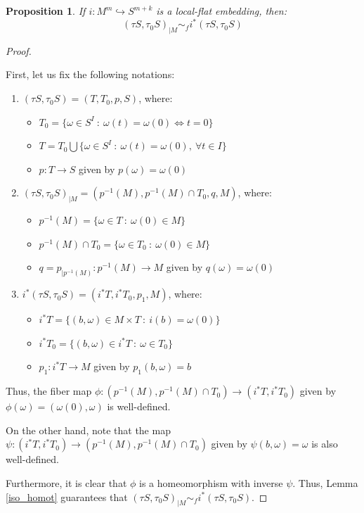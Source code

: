 \documentclass[12pt,oneside]{book}
\newtheorem{prop}   {Proposition}[chapter]
\begin{document}
    \begin{prop}\label{iso_merg_lf_2}
        If $i:M^{m}\hookrightarrow S^{m+k}$ is a local-flat embedding, then:
        $$ (\tau S,\tau_{0}S)_{|M}\sim_{f} i^{*}(\tau S,\tau_{0}S) $$
    \end{prop}
    \begin{proof}

        \
        
        First, let us fix the following notations:
        
        \begin{enumerate}
            \item $(\tau S,\tau_{0}S)=(T,T_{0},p,S)$, where:
            \begin{itemize}
                \item $T_{0}=\{ \omega\in S^{I} \ : \ \omega(t)=\omega(0) \Leftrightarrow t=0 \}$
                \item $T=T_{0}\bigcup \{ \omega\in S^{I} \ : \ \omega(t)=\omega(0), \ \forall t\in I \}$
                \item $p:T\to S$ given by $p(\omega)=\omega(0)$
            \end{itemize}
            \item $(\tau S,\tau_{0}S)_{|M}=(p^{-1}(M),p^{-1}(M)\cap T_{0},q,M)$, where:
            \begin{itemize}
                \item $p^{-1}(M)=\{ \omega\in T \ : \ \omega(0)\in M \}$
                \item $p^{-1}(M)\cap T_{0}=\{ \omega\in T_{0} \ : \ \omega(0)\in M \}$
                \item $q=p_{|p^{-1}(M)}:p^{-1}(M)\to M$ given by $q(\omega)=\omega(0)$
            \end{itemize}
            \item $i^{*}(\tau S,\tau_{0}S)=(i^{*}T,i^{*}T_{0},p_{1},M)$, where:
            \begin{itemize}
                \item $i^{*}T=\{ (b,\omega)\in M\times T \ : \ i(b)=\omega(0) \}$
                \item $i^{*}T_{0}=\{ (b,\omega)\in i^{*}T \ : \ \omega\in T_{0} \}$
                \item $p_{1}:i^{*}T\to M$ given by $p_{1}(b,\omega)=b$
            \end{itemize}
        \end{enumerate}
        
        Thus, the fiber map $\phi:(p^{-1}(M),p^{-1}(M)\cap T_{0})\to (i^{*}T,i^{*}T_{0})$ given by $\phi(\omega)=(\omega(0),\omega)$ is 
        well-defined.

        On the other hand, note that the map $\psi:(i^{*}T,i^{*}T_{0})\to (p^{-1}(M),p^{-1}(M)\cap T_{0})$ given by $\psi(b,\omega)=\omega$ is 
        also well-defined.
        
        Furthermore, it is clear that $\phi$ is a homeomorphism with inverse $\psi$. Thus, Lemma \ref{iso_homot} guarantees that 
        $(\tau S,\tau_{0}S)_{|M}\sim_{f} i^{*}(\tau S,\tau_{0}S)$.
        
    \end{proof}
\end{document}
